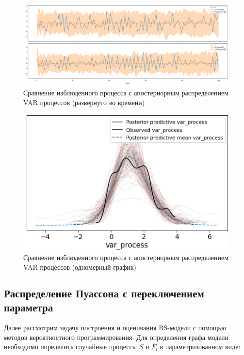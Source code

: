 \documentclass[a4paper,14pt]{extreport}
\begin{document}
\begin{figure}[H]
	\includegraphics[width=\linewidth]{img/gen/pp_var_realization.png}
	\caption{Сравнение наблюденного процесса с апостериорным распределением VAR процессов (развернуто во времени)}
	\label{fig:pp_var_realization}
\end{figure}

\begin{figure}[H]
	\includegraphics[width=\linewidth]{img/gen/pp_var_ppc.png}
	\caption{Сравнение наблюденного процесса с апостериорным распределением VAR процессов (одномерный график)}
	\label{fig:pp_var_ppc}
\end{figure}




\subsection{Распределение Пуассона с переключением параметра}

\label{subsection:ms_pois}

Далее рассмотрим задачу построения и оценивания RS-модели с помощью методов вероятностного программирования. Для определения графа модели необходимо определить случайные процессы $S$ и $F_l$ в параметризованном виде:
\end{document}
